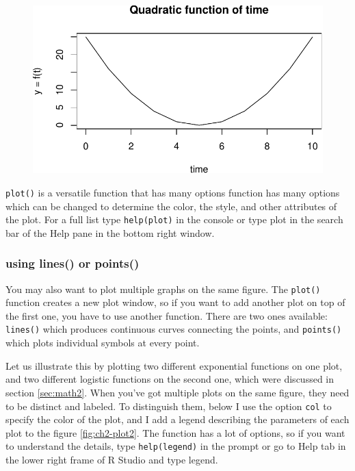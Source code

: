 \documentclass[
  letterpaper,
  DIV=11,
  numbers=noendperiod]{scrreprt}
\begin{document}
\begin{figure}[H]

{\centering \includegraphics{./functions_files/figure-pdf/unnamed-chunk-23-1.pdf}

}

\end{figure}

\texttt{plot()} is a versatile function that has many options function
has many options which can be changed to determine the color, the style,
and other attributes of the plot. For a full list type
\texttt{help(plot)} in the console or type plot in the search bar of the
Help pane in the bottom right window.

\hypertarget{using-lines-or-points}{%
\subsubsection{using lines() or points()}\label{using-lines-or-points}}

You may also want to plot multiple graphs on the same figure. The
\texttt{plot()} function creates a new plot window, so if you want to
add another plot on top of the first one, you have to use another
function. There are two ones available: \texttt{lines()} which produces
continuous curves connecting the points, and \texttt{points()} which
plots individual symbols at every point.

Let us illustrate this by plotting two different exponential functions
on one plot, and two different logistic functions on the second one,
which were discussed in section \ref{sec:math2}. When you've got
multiple plots on the same figure, they need to be distinct and labeled.
To distinguish them, below I use the option \texttt{col} to specify the
color of the plot, and I add a legend describing the parameters of each
plot to the figure \ref{fig:ch2-plot2}. The function has a lot of
options, so if you want to understand the details, type
\texttt{help(legend)} in the prompt or go to Help tab in the lower right
frame of R Studio and type legend.
\end{document}
